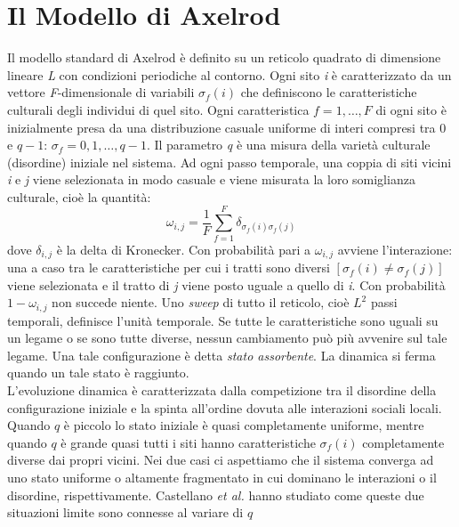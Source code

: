 \documentclass[a4paper,12pt]{article}
\begin{document}
\clearpage
\section{Il Modello di Axelrod}
Il modello standard di Axelrod \`{e} definito su un reticolo quadrato di dimensione lineare \textit{L} con condizioni periodiche al contorno. 
Ogni sito \textit{i} \`{e} caratterizzato da un vettore \textit{F}-dimensionale di variabili $\sigma_f(i)$ che definiscono le caratteristiche culturali degli individui di quel sito.
Ogni caratteristica $f=1,\dots,F$ di ogni sito \`{e} inizialmente presa da una distribuzione casuale uniforme di interi compresi tra 0 e $q-1$: $\sigma_f = 0,1,\dots,q-1$.
Il parametro \textit{q} \`{e} una misura della variet\`{a} culturale (disordine) iniziale nel sistema.
Ad ogni passo temporale, una coppia di siti vicini \textit{i} e \textit{j} viene selezionata in modo casuale e viene misurata la loro somiglianza culturale, cio\`{e} la quantit\`{a}:
\begin{equation}
 \omega_{i,j} = \frac{1}{F} \sum_{f=1}^F \delta_{\sigma_f(i) \sigma_f(j)}
\end{equation}
dove $\delta_{i,j}$ \`{e} la delta di Kronecker.
Con probabilit\`{a} pari a $\omega_{i,j}$ avviene l'interazione: una a caso tra le caratteristiche per cui i tratti sono diversi 
$[ \sigma_f(i) \neq \sigma_f(j) ]$ viene selezionata e il tratto di \textit{j} viene posto uguale a quello di \textit{i}.
Con probabilit\`{a} $1-\omega_{i,j}$ non succede niente.
Uno \textit{sweep} di tutto il reticolo, cio\`{e} $L^2$ passi temporali, definisce l'unit\`{a} temporale.
Se tutte le caratteristiche sono uguali su un legame o se sono tutte diverse, nessun cambiamento pu\`{o} pi\`{u} avvenire sul tale legame.
Una tale configurazione \`{e} detta \textit{stato assorbente}. La dinamica si ferma quando un tale stato \`{e} raggiunto.
\\L'evoluzione dinamica \`{e} caratterizzata dalla competizione tra il disordine della configurazione iniziale e la spinta all'ordine
dovuta alle interazioni sociali locali. 
Quando $q$ \`{e} piccolo lo stato iniziale \`{e} quasi completamente uniforme, mentre quando $q$ \`{e} grande quasi tutti i siti
hanno caratteristiche $\sigma_f(i)$ completamente diverse dai propri vicini. Nei due casi ci aspettiamo che il sistema converga ad
uno stato uniforme o altamente fragmentato in cui dominano le interazioni o il disordine, rispettivamente.
Castellano \textit{et al.} \cite{Castellano} hanno studiato come queste due situazioni limite sono connesse al variare di $q$
\end{document}
